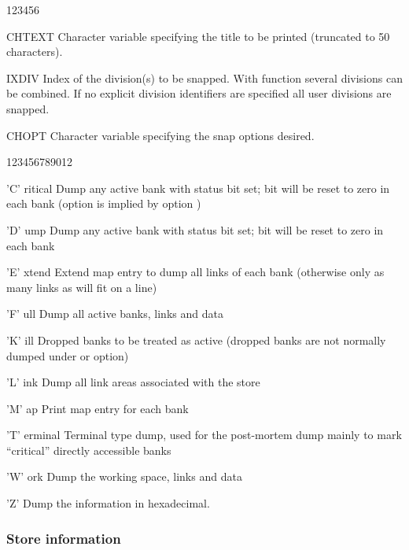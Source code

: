 \begin{DLtt}{123456}
\item[CHTEXT] Character variable specifying the title to be printed
      (truncated to 50 characters).
\item[IXDIV]  Index of the division(s) to be snapped.
      With function  several divisions can be combined.
      If no explicit division identifiers are specified
      all user divisions are snapped.
\item[CHOPT]Character variable specifying the snap options desired.
\begin{DLttc}{123456789012}
\item['C' ritical]Dump any active bank with status bit  set;
bit  will be reset to zero in each bank
(option  is implied by option )
\item['D' ump]Dump any active bank with status bit  set;
bit  will be reset to zero in each bank
\item['E' xtend]Extend map entry to dump all links of each bank
(otherwise only as many links as will fit on a line)
\item['F' ull]Dump all active banks, links and data
\item['K' ill]Dropped banks to be treated as active
(dropped banks are not normally dumped under  or  option)
\item['L' ink]Dump all link areas associated with the store
\item['M' ap]Print map entry for each bank
\item['T' erminal]Terminal type dump, used for the post-mortem dump
mainly to mark ``critical'' directly accessible banks
\item['W' ork]Dump the working space, links and data
\item['Z']Dump the information in hexadecimal.
\end{DLttc}
\end{DLtt}

\subsubsection{Store information}

